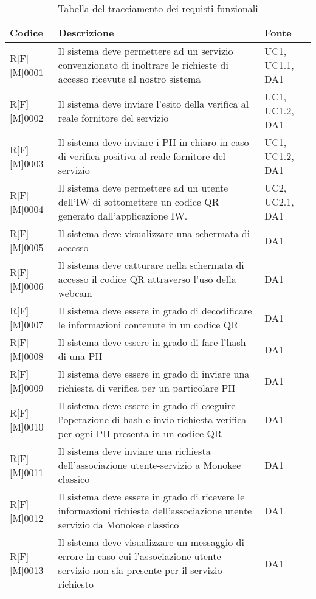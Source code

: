 \newpage
\begin{center}
\begin{longtable}{|p{2cm}|p{9cm}|p{2cm}|}%
\caption{Tabella del tracciamento dei requisti funzionali}
\label{tab:requisiti-funzionali-sp}
\endfirsthead
\endhead
\hline
\textbf{Codice} & \textbf{Descrizione} & \textbf{Fonte}\\
\hline
R[F][M]0001     & Il sistema deve permettere ad un servizio convenzionato di inoltrare le richieste di accesso ricevute al nostro sistema & UC1, UC1.1, DA1 \\
\hline
R[F][M]0002     & Il sistema deve inviare l’esito della verifica al reale fornitore del servizio & UC1, UC1.2, DA1 \\
\hline
R[F][M]0003     & Il sistema deve inviare i PII in chiaro in caso di verifica positiva al reale fornitore del servizio & UC1, UC1.2, DA1 \\
\hline
R[F][M]0004     & Il sistema deve permettere ad un utente dell’IW di sottomettere un codice QR generato dall’applicazione IW. & UC2, UC2.1, DA1 \\
\hline
R[F][M]0005     & Il sistema deve visualizzare una schermata di accesso & DA1 \\
\hline
R[F][M]0006     & Il sistema deve catturare nella schermata di accesso il codice QR attraverso l’uso della webcam & DA1 \\
\hline
R[F][M]0007     & Il sistema deve essere in grado di decodificare le informazioni contenute in un codice QR & DA1 \\
\hline
R[F][M]0008     & Il sistema deve essere in grado di fare l’hash di una PII & DA1 \\
\hline
R[F][M]0009     & Il sistema deve essere in grado di inviare una richiesta di verifica per un particolare PII  & DA1 \\
\hline
R[F][M]0010     & Il sistema deve essere in grado di eseguire l’operazione di hash e invio richiesta verifica per ogni PII presenta in un codice QR & DA1 \\
\hline
R[F][M]0011     & Il sistema deve inviare una richiesta dell’associazione utente-servizio a Monokee classico & DA1 \\
\hline
R[F][M]0012     & Il sistema deve essere in grado di ricevere le informazioni richiesta dell’associazione utente servizio da Monokee classico & DA1 \\
\hline
R[F][M]0013     & Il sistema deve visualizzare un messaggio di errore in caso cui l’associazione utente-servizio non sia presente per il servizio richiesto & DA1 \\

\end{longtable}
\end{center}
